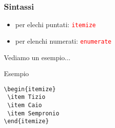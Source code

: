\begin{frame}[fragile]
 \frametitle{Sintassi}
 
 \begin{itemize}
  \item per elechi puntati: \textcolor{red}{\texttt{itemize}}
  \item per elenchi numerati: \textcolor{red}{\texttt{enumerate}}
 \end{itemize}
 
 Vediamo un esempio...
 \begin{exampleblock}{Esempio}
 \begin{lstlisting}[frame = single, title={Una lista puntata}] 
\begin{itemize}
 \item Tizio
 \item Caio
 \item Sempronio
\end{itemize}
  \end{lstlisting}
 \end{exampleblock}


\end{frame}
